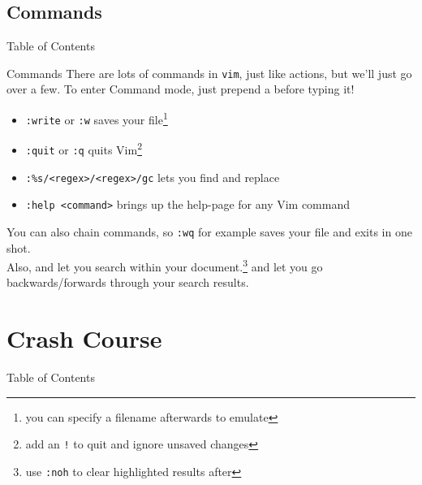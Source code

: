 \documentclass{beamer}
\begin{document}
\subsection{Commands}
\begin{frame}{Table of Contents}
	\tableofcontents[currentsubsection]
\end{frame}

\begin{frame}{Commands}
	There are lots of commands in \texttt{vim}, just like actions, but we'll
	just go over a few. To enter Command mode, just prepend a \keys{:}
	before typing it!
	\pause

	\begin{itemize}
		\item \texttt{:write} or \texttt{:w} saves your
			file\footnote{you can specify a filename afterwards to
			emulate }
			\pause

		\item \texttt{:quit} or \texttt{:q} quits Vim\footnote{add an
			\texttt{!} to quit and ignore unsaved changes}
			\pause

		\item \texttt{:\%s/<regex>/<regex>/gc} lets you find and replace
			\pause

		\item \texttt{:help <command>} brings up the help-page for any
			Vim command
	\end{itemize}
	\pause

	You can also chain commands, so \texttt{:wq} for example saves your file
	and exits in one shot.\\

	Also, \keys{\textbackslash} and  let you search within your
	document.\footnote{use \texttt{:noh} to clear highlighted results after}
	 and  let you go backwards/forwards through your search
	results.
\end{frame}

\section{Crash Course}
\begin{frame}{Table of Contents}
	\tableofcontents[currentsection]
\end{frame}
\end{document}
